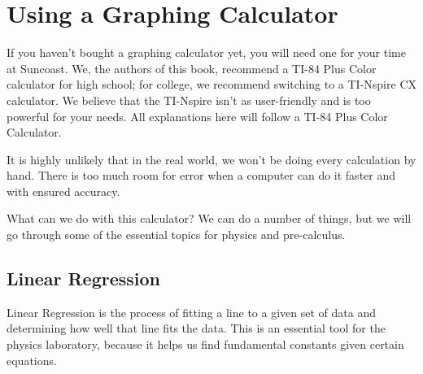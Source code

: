 \documentclass[lang=en,11pt]{elegantbook}
\begin{document}
\section{Using a Graphing Calculator}
\noindent If you haven't bought a graphing calculator yet, you will need one for your time at Suncoast.  We, the authors of this book, recommend a TI-84 Plus Color calculator for high school; for college, we recommend switching to a TI-Nspire CX calculator.  We believe that the TI-Nspire isn't as user-friendly and is too powerful for your needs.  All explanations here will follow a TI-84 Plus Color Calculator.

It is highly unlikely that in the real world, we won't be doing every calculation by hand.  There is too much room for error when a computer can do it faster and with ensured accuracy.

What can we do with this calculator?  We can do a number of things, but we will go through some of the essential topics for physics and pre-calculus.
\subsection{Linear Regression}
\noindent Linear Regression is the process of fitting a line to a given set of data and determining how well that line fits the data.  This is an essential tool for the physics laboratory, because it helps us find fundamental constants given certain equations.
\end{document}
